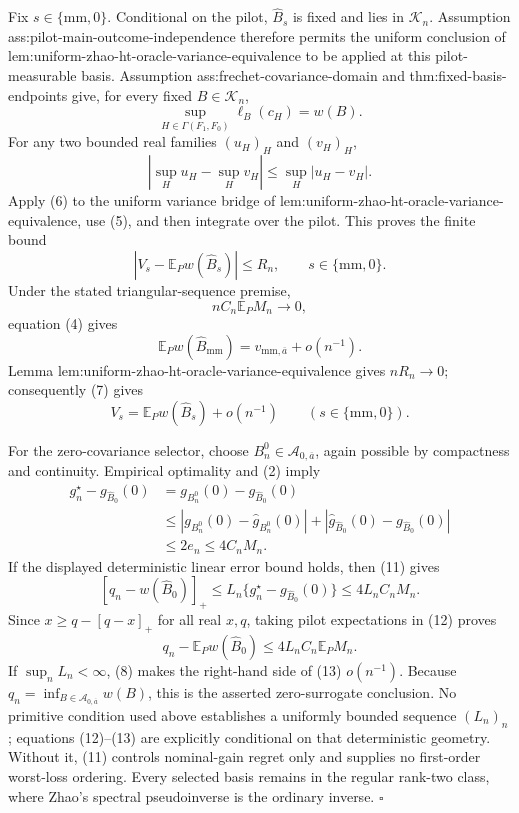 Fix \(s\in\{\mathrm{mm},0\}\).  Conditional on the pilot, \(\widehat B_s\) is fixed and lies in \(\mathcal K_n\).  Assumption ass:pilot-main-outcome-independence therefore permits the uniform conclusion of lem:uniform-zhao-ht-oracle-variance-equivalence to be applied at this pilot-measurable basis.  Assumption ass:frechet-covariance-domain and thm:fixed-basis-endpoints give, for every fixed \(B\in\mathcal K_n\),
\[
\sup_{H\in\Gamma(F_1,F_0)}\ell_B(c_H)=w(B).
\tag{5}
\]
For any two bounded real families \((u_H)_H\) and \((v_H)_H\),
\[
\left|\sup_Hu_H-\sup_Hv_H\right|
\le\sup_H|u_H-v_H|.
\tag{6}
\]
Apply (6) to the uniform variance bridge of lem:uniform-zhao-ht-oracle-variance-equivalence, use (5), and then integrate over the pilot.  This proves the finite bound
\[
\left|V_s-\mathbb E_Pw(\widehat B_s)\right|\le R_n,
\qquad s\in\{\mathrm{mm},0\}.
\tag{7}
\]
Under the stated triangular-sequence premise,
\[
nC_n\mathbb E_PM_n\longrightarrow0,
\tag{8}
\]
equation (4) gives
\[
\mathbb E_Pw(\widehat B_{\mathrm{mm}})
=v_{\mathrm{mm},\overline a}+o(n^{-1}).
\tag{9}
\]
Lemma lem:uniform-zhao-ht-oracle-variance-equivalence gives \(nR_n\to0\); consequently (7) gives
\[
V_s=\mathbb E_Pw(\widehat B_s)+o(n^{-1})
\qquad(s\in\{\mathrm{mm},0\}).
\tag{10}
\]

For the zero-covariance selector, choose \(B_n^0\in\mathcal A_{0,\overline a}\), again possible by compactness and continuity.  Empirical optimality and (2) imply
\[
\begin{aligned}
g_n^\star-g_{\widehat B_0}(0)
&=g_{B_n^0}(0)-g_{\widehat B_0}(0)\\
&\le
|g_{B_n^0}(0)-\widehat g_{B_n^0}(0)|
+|\widehat g_{\widehat B_0}(0)-g_{\widehat B_0}(0)|\\
&\le2e_n
\le4C_nM_n.
\end{aligned}
\tag{11}
\]
If the displayed deterministic linear error bound holds, then (11) gives
\[
[q_n-w(\widehat B_0)]_+
\le L_n\{g_n^\star-g_{\widehat B_0}(0)\}
\le4L_nC_nM_n.
\tag{12}
\]
Since \(x\ge q-[q-x]_+\) for all real \(x,q\), taking pilot expectations in (12) proves
\[
q_n-\mathbb E_Pw(\widehat B_0)
\le4L_nC_n\mathbb E_PM_n.
\tag{13}
\]
If \(\sup_nL_n<\infty\), (8) makes the right-hand side of (13) \(o(n^{-1})\).  Because \(q_n=\inf_{B\in\mathcal A_{0,\overline a}}w(B)\), this is the asserted zero-surrogate conclusion.  No primitive condition used above establishes a uniformly bounded sequence \((L_n)_n\); equations (12)--(13) are explicitly conditional on that deterministic geometry.  Without it, (11) controls nominal-gain regret only and supplies no first-order worst-loss ordering.  Every selected basis remains in the regular rank-two class, where Zhao's spectral pseudoinverse is the ordinary inverse. \(\square\)